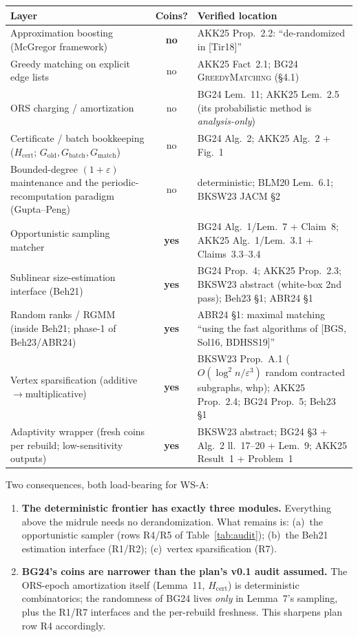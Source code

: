 \documentclass[11pt]{article}
\begin{document}
\begin{center}\footnotesize
\begin{tabular}{@{}p{}cp{}@{}}
\toprule
Layer & Coins? & Verified location \\
\midrule
Approximation boosting (McGregor framework) & \textbf{no} & AKK25 Prop.~2.2: ``de-randomized in [Tir18]'' \\
Greedy matching on explicit edge lists & no & AKK25 Fact~2.1; BG24 \textsc{GreedyMatching} (\S4.1) \\
ORS charging / amortization & no & BG24 Lem.~11; AKK25 Lem.~2.5 (its probabilistic method is \emph{analysis-only}) \\
Certificate / batch bookkeeping ($H_{\mathrm{cert}}$; $G_{\mathrm{old}},G_{\mathrm{batch}},G_{\mathrm{match}}$) & no & BG24 Alg.~2; AKK25 Alg.~2 + Fig.~1 \\
Bounded-degree $(1+\varepsilon)$ maintenance and the periodic-recomputation paradigm (Gupta--Peng) & no & deterministic; BLM20 Lem.~6.1; BKSW23 JACM \S2 \\
\midrule
Opportunistic sampling matcher & \textbf{yes} & BG24 Alg.~1/Lem.~7 + Claim~8; AKK25 Alg.~1/Lem.~3.1 + Claims~3.3--3.4 \\
Sublinear size-estimation interface (Beh21) & \textbf{yes} & BG24 Prop.~4; AKK25 Prop.~2.3; BKSW23 abstract (white-box 2nd pass); Beh23 \S1; ABR24 \S1 \\
Random ranks / RGMM (inside Beh21; phase-1 of Beh23/ABR24) & \textbf{yes} & ABR24 \S1: maximal matching ``using the fast algorithms of [BGS, Sol16, BDHSS19]'' \\
Vertex sparsification (additive$\to$multiplicative) & \textbf{yes} & BKSW23 Prop.~A.1 ($O(\log^2 n/\varepsilon^3)$ random contracted subgraphs, whp); AKK25 Prop.~2.4; BG24 Prop.~5; Beh23 \S1 \\
Adaptivity wrapper (fresh coins per rebuild; low-sensitivity outputs) & \textbf{yes} & BKSW23 abstract; BG24 \S3 + Alg.~2 ll.~17--20 + Lem.~9; AKK25 Result~1 + Problem~1 \\
\bottomrule
\end{tabular}
\end{center}

\noindent Two consequences, both load-bearing for WS-A:

\begin{enumerate}
\item \textbf{The deterministic frontier has exactly three modules.}
Everything above the midrule needs no derandomization. What remains is:
(a)~the opportunistic sampler (rows R4/R5 of Table~\ref{tab:audit});
(b)~the Beh21 estimation interface (R1/R2); (c)~vertex sparsification (R7).
\item \textbf{BG24's coins are narrower than the plan's v0.1 audit assumed.}
The ORS-epoch amortization itself (Lemma~11, $H_{\mathrm{cert}}$) is
deterministic combinatorics; the randomness of BG24 lives \emph{only} in
Lemma~7's sampling, plus the R1/R7 interfaces and the per-rebuild freshness.
This sharpens plan row R4 accordingly.
\end{enumerate}
\end{document}

